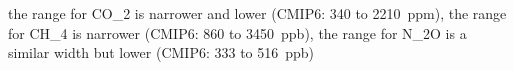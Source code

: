 the range for CO_2 is narrower and lower (CMIP6: 340 to 2210~ppm),
the range for CH_4 is narrower (CMIP6: 860 to 3450~ppb),
the range for N_2O is a similar width but lower (CMIP6: 333 to 516~ppb)
